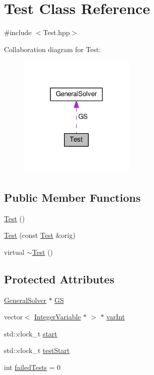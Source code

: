 \hypertarget{class_test}{\section{Test Class Reference}
\label{class_test}
}


{\ttfamily \#include $<$Test.\-hpp$>$}



Collaboration diagram for Test\-:\nopagebreak
\begin{figure}[H]
\begin{center}
\leavevmode
\includegraphics[width=158pt]{class_test__coll__graph}
\end{center}
\end{figure}
\subsection*{Public Member Functions}
\begin{DoxyCompactItemize}
\item 
\hyperlink{class_test_a99f2bbfac6c95612322b0f10e607ebe5}{Test} ()
\item 
\hyperlink{class_test_aebeeeb367fbe9428cfbcee429876fd62}{Test} (const \hyperlink{class_test}{Test} \&orig)
\item 
virtual \hyperlink{class_test_a2b0a62f1e667bbe8d8cb18d785bfa991}{$\sim$\-Test} ()
\end{DoxyCompactItemize}
\subsection*{Protected Attributes}
\begin{DoxyCompactItemize}
\item 
\hyperlink{class_general_solver}{General\-Solver} $\ast$ \hyperlink{class_test_a8dde0db9f022bb331283df8cc0b85d8c}{G\-S}
\item 
vector$<$ \hyperlink{class_integer_variable}{Integer\-Variable} $\ast$ $>$ $\ast$ \hyperlink{class_test_aaaa874634bb96962296189b4910641f5}{var\-Int}
\item 
std\-::clock\-\_\-t \hyperlink{class_test_abbea9e118d54f37e96661bcd314a9f6a}{start}
\item 
std\-::clock\-\_\-t \hyperlink{class_test_a0a7a04e46cd3875b6d81fc68fb92204f}{test\-Start}
\item 
int \hyperlink{class_test_a72dca50d6f671c662b15fd52c4846bca}{failed\-Tests} = 0
\end{DoxyCompactItemize}
